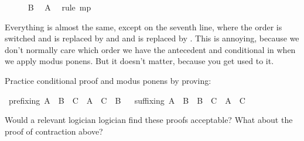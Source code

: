 \begin{isabellebody}
\ \ \ \ \isamarkupfalse%
\ {\isachardoublequoteopen}B{\isachardoublequoteclose}\ \isamarkupfalse%
\ {\isacharbackquoteopen}A{\isacharbackquoteclose}\ \isamarkupfalse%
\ {\isacharparenleft}rule\ mp{\isacharparenright}\isanewline
\ \ \isamarkupfalse%
\isanewline
{}\isamarkupfalse%
%
\endisatagproof
{\isafoldproof}%
%
\isadelimproof
%
\endisadelimproof
%
\begin{isamarkuptext}%
Everything is almost the same, except on the seventh line, where the order is switched and
 is replaced by  and  and  is replaced by .
This is annoying, because we don't normally care which order we have the antecedent and conditional
in when we apply modus ponens. But it doesn't matter, because you get used to it.%
\end{isamarkuptext}\isamarkuptrue%
%
\begin{isamarkuptext}%
\begin{Exercise} Practice conditional proof and modus ponens by proving: \end{Exercise}%
\end{isamarkuptext}\isamarkuptrue%
\isamarkupfalse%
\ prefixing{\isacharcolon}\ {\isachardoublequoteopen}{\isacharparenleft}A\ {\isasymlongrightarrow}\ B{\isacharparenright}\ {\isasymlongrightarrow}\ {\isacharparenleft}C\ {\isasymlongrightarrow}\ A{\isacharparenright}\ {\isasymlongrightarrow}\ {\isacharparenleft}C\ {\isasymlongrightarrow}\ B{\isacharparenright}{\isachardoublequoteclose}%
\isadelimproof
\ %
\endisadelimproof
%
\isatagproof
{}\isamarkupfalse%
%
\endisatagproof
{\isafoldproof}%
%
\isadelimproof
%
\endisadelimproof
\isanewline
\isanewline
{}\isamarkupfalse%
\ suffixing{\isacharcolon}\ {\isachardoublequoteopen}{\isacharparenleft}A\ {\isasymlongrightarrow}\ B{\isacharparenright}\ {\isasymlongrightarrow}\ {\isacharparenleft}B\ {\isasymlongrightarrow}\ C{\isacharparenright}\ {\isasymlongrightarrow}\ {\isacharparenleft}A\ {\isasymlongrightarrow}\ C{\isacharparenright}{\isachardoublequoteclose}%
\isadelimproof
\ %
\endisadelimproof
%
\isatagproof
{}\isamarkupfalse%
%
\endisatagproof
{\isafoldproof}%
%
\isadelimproof
%
\endisadelimproof
%
\begin{isamarkuptext}%
Would a relevant logician logician find these proofs acceptable? What about the proof of
contraction above?%
\end{isamarkuptext}\isamarkuptrue%

\end{isabellebody}
